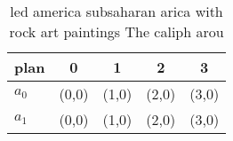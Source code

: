\documentclass[a4paper]{article}
\begin{document}
\begin{table}
\begin{adjustbox}{width=0.5\columnwidth}
\begin{tabular}{|l|l|l|l|l|}
\hline
\textbf{plan} & \multicolumn{1}{c|}{\textbf{0}} & \multicolumn{1}{c|}{\textbf{1}} & \multicolumn{1}{c|}{\textbf{2}} & \multicolumn{1}{c|}{\textbf{3}} \\ \hline
\textbf{$a_0$}  & (0,0) & (1,0) & (2,0) & (3,0) \\ \hline
\textbf{$a_1$}  & (0,0) & (1,0) & (2,0) & (3,0) \\ \hline
\end{tabular}
\end{adjustbox}
\caption{ led america subsaharan arica with rock art paintings The caliph arou
}
\end{table}
\end{document}
